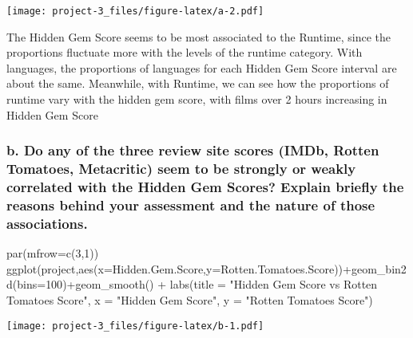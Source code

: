 \documentclass[
]{article}
\newenvironment{Shaded}{\begin{snugshade}}{\end{snugshade}}
\newcommand{\AttributeTok}[1]{\textcolor[rgb]{0.77,0.63,0.00}{#1}}
\newcommand{\DecValTok}[1]{\textcolor[rgb]{0.00,0.00,0.81}{#1}}
\newcommand{\FunctionTok}[1]{\textcolor[rgb]{0.00,0.00,0.00}{#1}}
\newcommand{\NormalTok}[1]{#1}
\newcommand{\SpecialCharTok}[1]{\textcolor[rgb]{0.00,0.00,0.00}{#1}}
\newcommand{\StringTok}[1]{\textcolor[rgb]{0.31,0.60,0.02}{#1}}
\begin{document}
\texttt{[image: project-3\_files/figure-latex/a-2.pdf]}

The Hidden Gem Score seems to be most associated to the Runtime, since
the proportions fluctuate more with the levels of the runtime category.
With languages, the proportions of languages for each Hidden Gem Score
interval are about the same. Meanwhile, with Runtime, we can see how the
proportions of runtime vary with the hidden gem score, with films over 2
hours increasing in Hidden Gem Score

\newpage

\hypertarget{b.-do-any-of-the-three-review-site-scores-imdb-rotten-tomatoes-metacritic-seem-to-be-strongly-or-weakly-correlated-with-the-hidden-gem-scores-explain-briefly-the-reasons-behind-your-assessment-and-the-nature-of-those-associations.}{%
\subsubsection{b. Do any of the three review site scores (IMDb, Rotten
Tomatoes, Metacritic) seem to be strongly or weakly correlated with the
Hidden Gem Scores? Explain briefly the reasons behind your assessment
and the nature of those
associations.}\label{b.-do-any-of-the-three-review-site-scores-imdb-rotten-tomatoes-metacritic-seem-to-be-strongly-or-weakly-correlated-with-the-hidden-gem-scores-explain-briefly-the-reasons-behind-your-assessment-and-the-nature-of-those-associations.}}

\begin{Shaded}
\begin{Highlighting}[]
\FunctionTok{par}\NormalTok{(}\AttributeTok{mfrow=}\FunctionTok{c}\NormalTok{(}\DecValTok{3}\NormalTok{,}\DecValTok{1}\NormalTok{))}
\FunctionTok{ggplot}\NormalTok{(project,}\FunctionTok{aes}\NormalTok{(}\AttributeTok{x=}\NormalTok{Hidden.Gem.Score,}\AttributeTok{y=}\NormalTok{Rotten.Tomatoes.Score))}\SpecialCharTok{+}\FunctionTok{geom\_bin2d}\NormalTok{(}\AttributeTok{bins=}\DecValTok{100}\NormalTok{)}\SpecialCharTok{+}\FunctionTok{geom\_smooth}\NormalTok{() }\SpecialCharTok{+} \FunctionTok{labs}\NormalTok{(}\AttributeTok{title =} \StringTok{"Hidden Gem Score vs Rotten Tomatoes Score"}\NormalTok{, }\AttributeTok{x =} \StringTok{"Hidden Gem Score"}\NormalTok{, }\AttributeTok{y =} \StringTok{"Rotten Tomatoes Score"}\NormalTok{)}
\end{Highlighting}
\end{Shaded}

\texttt{[image: project-3\_files/figure-latex/b-1.pdf]}
\end{document}
